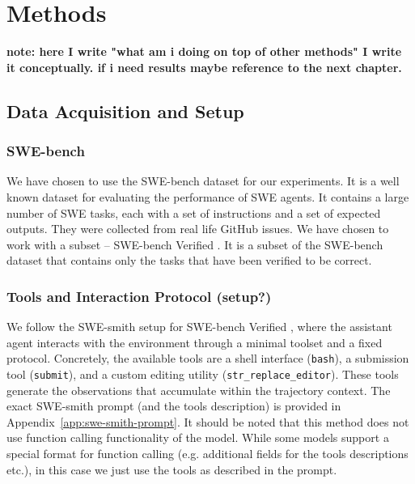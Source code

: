 \chapter{Methods}

\textbf{note: here I write "what am i doing on top of other methods" I write it conceptually. if i need results maybe reference to the next chapter.}



\section{Data Acquisition and Setup}

\subsection{SWE-bench}
We have chosen to use the SWE-bench \cite{jimenez2024swebench} dataset for our experiments.
It is a well known dataset for evaluating the performance of SWE agents.
It contains a large number of SWE tasks, each with a set of instructions and a set of expected outputs.
They were collected from real life GitHub issues. 
We have chosen to work with a subset -- SWE-bench Verified \cite{swebench-verified}.
It is a subset of the SWE-bench dataset that contains only the tasks that have been verified to be correct.

\subsection{Tools and Interaction Protocol (setup?)}
We follow the SWE-smith setup for SWE-bench Verified \cite{jimenez2024swebench}, where the assistant agent interacts with the environment through a minimal toolset and a fixed protocol. 
Concretely, the available tools are a shell interface (\texttt{bash}), a submission tool (\texttt{submit}), and a custom editing utility (\texttt{str\_replace\_editor}).
These tools generate the observations that accumulate within the trajectory context.
The exact SWE-smith prompt (and the tools description) is provided in Appendix~\ref{app:swe-smith-prompt}.
It should be noted that this method does not use function calling functionality of the model. 
While some models support a special format for function calling (e.g. additional fields for the tools descriptions etc.), in this case we just use the tools as described in the prompt.

